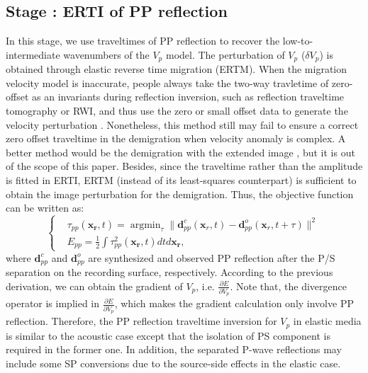 \subsection{Stage \uppercase\expandafter{}: ERTI of PP reflection}
In this stage, we use traveltimes of PP reflection to recover the low-to-intermediate wavenumbers of
the $V_p$ model. 
The perturbation of $V_p$ ($\delta V_p$) is obtained through elastic reverse time migration (ERTM). 
When the migration velocity model is inaccurate, 
people always take
the two-way travletime of zero-offset as an invariants during reflection inversion, such as reflection traveltime tomography or RWI,
and thus use the zero or small offset data to generate the velocity perturbation \cite[]{Zhou2015}. 
Nonetheless, this method still may fail to ensure a correct zero offset traveltime in the
demigration when velocity anomaly is complex. A better method would be the demigration with the extended
image \cite[]{Weibull2014, Hou2015, Qiang2017}, but it is out of the scope of this paper.
Besides, since the traveltime rather than the amplitude is fitted in ERTI, 
ERTM (instead of its least-squares counterpart) is sufficient to obtain the image perturbation for
the demigration.
Thus, the objective function can be written as:
\begin{equation}
	\left\{
		\begin{aligned}
			&\tau_{pp}(\mathbf{x_r},t)=\mathop{\arg\min}_{\tau}
			\parallel\mathbf{d}^{c}_{pp}(\mathbf{x}_r,t)-\mathbf{d}^{o}_{pp}(\mathbf{x}_r,t+\tau)\parallel^2\\
			&E_{pp}=\frac{1}{2}\int\tau^2_{pp}(\mathbf{x_r},t)dtd\mathbf{x_r},
		\end{aligned}
	\right.
    \label{eq:ObjectivefunctionPP} 
\end{equation}
where $\mathbf{d}^{c}_{pp}$ and $\mathbf{d}^{o}_{pp}$ are synthesized and observed PP reflection after the P/S
separation on the recording surface, respectively. According to the previous derivation, we can
obtain the gradient of  $V_p$, i.e. $\frac{\partial E}{\partial
V_p}$.
Note that, 
the divergence operator is implied in $\frac{\partial
E}{\partial V_p}$, which makes the gradient calculation only involve PP reflection.
Therefore, the PP reflection traveltime inversion for $V_p$ in elastic media is similar to the acoustic case
except that the isolation of PS component is required in the former one. In addition, the separated
P-wave reflections may include some SP conversions due to the source-side effects in the elastic
case. %
